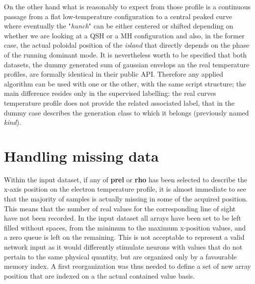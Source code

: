 On the other hand what is reasonably to expect from those profile is a continuous passage from a flat low-temperature configuration to a central peaked curve where eventually the "\textit{hunch}" can be either centered or shifted depending on whether we are looking at a QSH or a MH configuration and also, in the former case, the actual poloidal position of the \textit{island} that directly depends on the phase of the running dominant mode.
It is nevertheless worth to be specified that both datasets, the dummy generated sum of gaussian envelops an the real temperature profiles, are formally identical in their public API. Therefore  any applied algorithm can be used with one or the other, with the same script structure; the main difference resides only in the supervised labelling: the real curves temperature profile does not provide the related associated label, that in the dummy case describes the generation class to which it belongs (previously named \textit{kind}).





\section{Handling missing data}

Within the input dataset, if any of \textbf{prel} or \textbf{rho} has been selected to describe the x-axis position on the electron temperature profile, it is almost immediate to see that the majority of samples is actually missing in some of the acquired position. This means that the number of real values for the corresponding line of sight have not been recorded. 
In the input dataset all arrays have been set to be left filled without spaces, from the minimum to the maximum x-position values, and a zero queue is left on the remaining. This is not acceptable to represent a valid network input as it would differently stimulate neurons with values that do not pertain to the same physical quantity, but are organized only by a favourable memory index.
A first reorganization was thus needed to define a set of new array position that are indexed on a the actual contained value basis.

